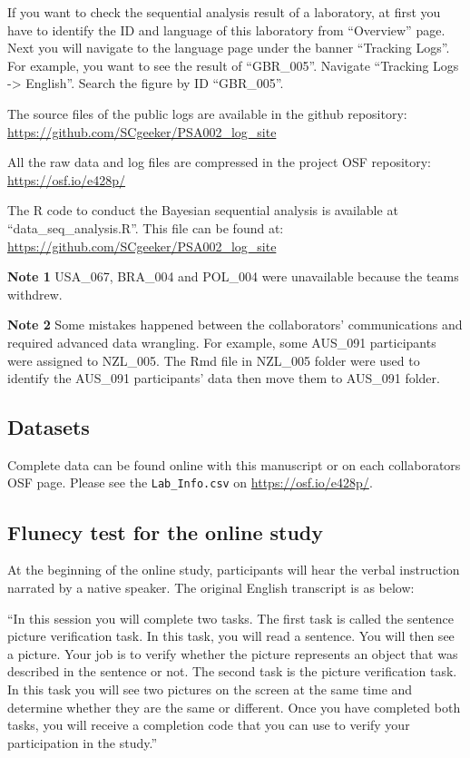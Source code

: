 \documentclass[
  man,floatsintext]{apa7}
\begin{document}
If you want to check the sequential analysis result of a laboratory, at first you have to identify the ID and language of this laboratory from ``Overview'' page. Next you will navigate to the language page under the banner ``Tracking Logs''. For example, you want to see the result of ``GBR\_005''. Navigate ``Tracking Logs -\textgreater{} English''. Search the figure by ID ``GBR\_005''.

The source files of the public logs are available in the github repository:
\url{https://github.com/SCgeeker/PSA002_log_site}

All the raw data and log files are compressed in the project OSF repository: \url{https://osf.io/e428p/}

The R code to conduct the Bayesian sequential analysis is available at ``data\_seq\_analysis.R''. This file can be found at: \url{https://github.com/SCgeeker/PSA002_log_site}

\textbf{Note 1} USA\_067, BRA\_004 and POL\_004 were unavailable because the teams withdrew.

\textbf{Note 2} Some mistakes happened between the collaborators' communications and required advanced data wrangling. For example, some AUS\_091 participants were assigned to NZL\_005. The Rmd file in NZL\_005 folder were used to identify the AUS\_091 participants' data then move them to AUS\_091 folder.

\hypertarget{datasets}{%
\subsection{Datasets}\label{datasets}}

Complete data can be found online with this manuscript or on each collaborators OSF page. Please see the \texttt{Lab\_Info.csv} on \url{https://osf.io/e428p/}.

\hypertarget{flunecy-test-for-the-online-study}{%
\subsection{Flunecy test for the online study}\label{flunecy-test-for-the-online-study}}

At the beginning of the online study, participants will hear the verbal instruction narrated by a native speaker. The original English transcript is as below:

``In this session you will complete two tasks. The first task is called the sentence picture verification task. In this task, you will read a sentence. You will then see a picture. Your job is to verify whether the picture represents an object that was described in the sentence or not. The second task is the picture verification task. In this task you will see two pictures on the screen at the same time and determine whether they are the same or different. Once you have completed both tasks, you will receive a completion code that you can use to verify your participation in the study.''
\end{document}
